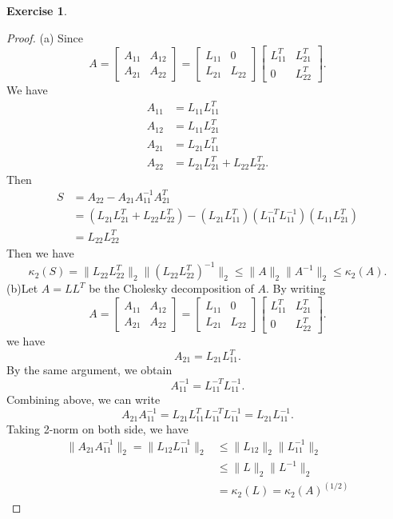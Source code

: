 \documentclass[11pt,a4paper]{article}
\renewcommand{\(}{\left(}
\renewcommand{\)}{\right)}
\newtheorem{exercise}{Exercise}
\begin{document}
	\begin{exercise}
	\end{exercise}  
	\begin{proof}
	(a)
	Since 
	\[
	A = 
	\begin{bmatrix}
		A_{11} & A_{12}\\
		A_{21} & A_{22}
	\end{bmatrix}
	=
	\begin{bmatrix}
		L_{11} & 0\\
		L_{21} & L_{22}
	\end{bmatrix}
	\begin{bmatrix}
		L_{11}^T & L_{21}^T\\
		0 & L_{22}^T
	\end{bmatrix}.
	\]
	We have 
	\begin{align*}
	A_{11} &= L_{11}L_{11}^T\\
	A_{12} &= L_{11}L_{21}^T\\
	A_{21} &= L_{21}L_{11}^T\\
	A_{22} &= L_{21}L_{21}^T + L_{22}L_{22}^T.
	\end{align*}
	Then 
	\begin{align*}
	S &= A_{22}-A_{21}A_{11}^{-1}A_{21}^T\\
	&=(L_{21}L_{21}^T + L_{22}L_{22}^T) - (L_{21}L_{11}^T)(L_{11}^{-T}L_{11}^{-1})(L_{11}L_{21}^T)\\
	&= L_{22}L_{22}^T
	\end{align*}	
	Then we have $$\kappa_2(S) =\|L_{22}L_{22}^T\|_2\|(L_{22}L_{22}^T)^{-1}\|_2 \le \|A\|_2\|A^{-1}\|_2 \le \kappa_2(A).$$
	(b)Let $A = LL^T$ be the Cholesky decomposition of $A$.
	By writing 
	\[
	A = 
	\begin{bmatrix}
	A_{11} & A_{12}\\
	A_{21} & A_{22}
	\end{bmatrix}
	=
	\begin{bmatrix}
	L_{11} & 0\\
	L_{21} & L_{22}
	\end{bmatrix}
	\begin{bmatrix}
	L_{11}^T & L_{21}^T\\
	0 & L_{22}^T
	\end{bmatrix}.
	\]
	we have $$A_{21} = L_{21}L_{11}^T.$$
	By the same argument, we obtain
	$$A_{11}^{-1}=L_{11}^{-T}L_{11}^{-1}.$$
	Combining above, we can write
	$$A_{21}A_{11}^{-1}=L_{21}L_{11}^TL_{11}^{-T}L_{11}^{-1} = L_{21}L_{11}^{-1}.$$
	Taking 2-norm on both side, we have 
	\begin{align*}
	\|A_{21}A_{11}^{-1}\|_2 = \|L_{12}L_{11}^{-1}\|_2 &\le \|L_{12}\|_2\|L_{11}^{-1}\|_2 \\
	&\le \|L\|_2\|L^{-1}\|_2\\
	& = \kappa_2(L) =   \kappa_2(A)^{(1/2)}
	\end{align*}
	
	\end{proof} 


  
\end{document}
